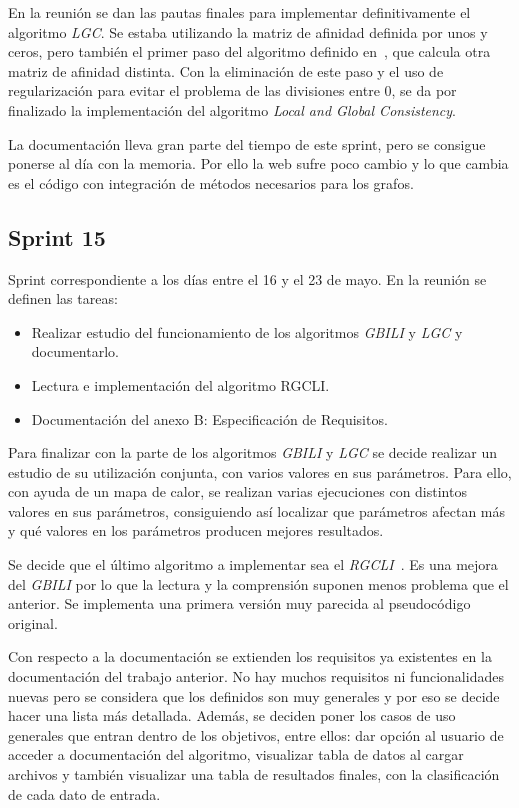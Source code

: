 En la reunión se dan las pautas finales para implementar definitivamente el algoritmo \textit{LGC}. Se estaba utilizando la matriz de afinidad definida por unos y ceros, pero también el primer paso del algoritmo definido en~\cite{LGC}, que calcula otra matriz de afinidad distinta. Con la eliminación de este paso y el uso de regularización para evitar el problema de las divisiones entre 0, se da por finalizado la implementación del algoritmo \textit{Local and Global Consistency}.

La documentación lleva gran parte del tiempo de este sprint, pero se consigue ponerse al día con la memoria. Por ello la web sufre poco cambio y lo que cambia es el código con integración de métodos necesarios para los grafos.

\subsection{Sprint 15}
Sprint correspondiente a los días entre el 16 y el 23 de mayo. En la reunión se definen las tareas:
\begin{itemize}
	\item Realizar estudio del funcionamiento de los algoritmos \textit{GBILI} y \textit{LGC} y documentarlo.
	\item Lectura e implementación del algoritmo RGCLI.
	\item Documentación del anexo B: Especificación de Requisitos.
\end{itemize}

Para finalizar con la parte de los algoritmos \textit{GBILI} y \textit{LGC} se decide realizar un estudio de su utilización conjunta, con varios valores en sus parámetros. Para ello, con ayuda de un mapa de calor, se realizan varias ejecuciones con distintos valores en sus parámetros, consiguiendo así localizar que parámetros afectan más y qué valores en los parámetros producen mejores resultados.

Se decide que el último algoritmo a implementar sea el \textit{RGCLI}~\cite{rgcli}. Es una mejora del \textit{GBILI} por lo que la lectura y la comprensión suponen menos problema que el anterior. Se implementa una primera versión muy parecida al pseudocódigo original.

Con respecto a la documentación se extienden los requisitos ya existentes en la documentación del trabajo anterior. No hay muchos requisitos ni funcionalidades nuevas pero se considera que los definidos son muy generales y por eso se decide hacer una lista más detallada. Además, se deciden poner los casos de uso generales que entran dentro de los objetivos, entre ellos: dar opción al usuario de acceder a documentación del algoritmo, visualizar tabla de datos al cargar archivos y también visualizar una tabla de resultados finales, con la clasificación de cada dato de entrada. 

